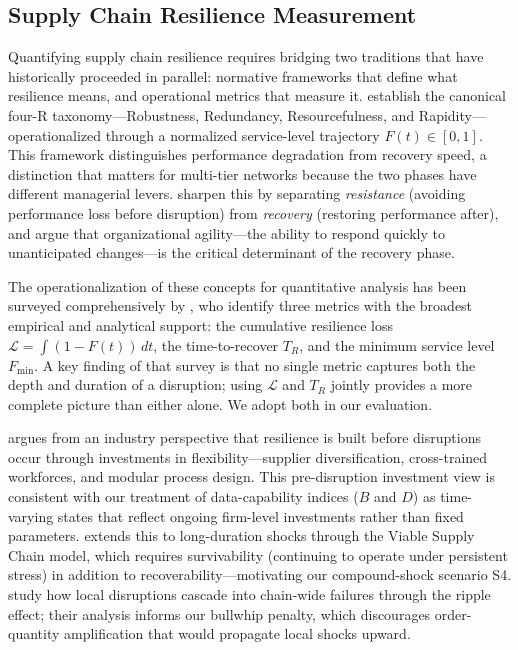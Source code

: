 \documentclass[11pt,a4paper]{article}
\theoremstyle{plain}
\theoremstyle{definition}
\begin{document}
\subsection{Supply Chain Resilience Measurement}

Quantifying supply chain resilience requires bridging two traditions that have historically
proceeded in parallel: normative frameworks that define what resilience means, and
operational metrics that measure it.  \citet{bruneau2003framework} establish the canonical
four-R taxonomy---Robustness, Redundancy, Resourcefulness, and Rapidity---operationalized
through a normalized service-level trajectory $F(t)\in[0,1]$.  This framework distinguishes
performance degradation from recovery speed, a distinction that matters for multi-tier
networks because the two phases have different managerial levers.
\citet{christopher2004building} sharpen this by separating \emph{resistance} (avoiding
performance loss before disruption) from \emph{recovery} (restoring performance after), and
argue that organizational agility---the ability to respond quickly to unanticipated
changes---is the critical determinant of the recovery phase.

The operationalization of these concepts for quantitative analysis has been surveyed
comprehensively by \citet{hosseini2019review}, who identify three metrics with the broadest
empirical and analytical support: the cumulative resilience loss $\mathcal{L}=\int(1-F(t))\,dt$,
the time-to-recover $T_R$, and the minimum service level $F_{\min}$.  A key finding of
that survey is that no single metric captures both the depth and duration of a disruption;
using $\mathcal{L}$ and $T_R$ jointly provides a more complete picture than either alone.
We adopt both in our evaluation.

\citet{sheffi2005resilient} argues from an industry perspective that resilience is built
before disruptions occur through investments in flexibility---supplier diversification,
cross-trained workforces, and modular process design.  This pre-disruption investment view
is consistent with our treatment of data-capability indices ($B$ and $D$) as time-varying
states that reflect ongoing firm-level investments rather than fixed parameters.
\citet{ivanov2020viable} extends this to long-duration shocks through the Viable Supply
Chain model, which requires survivability (continuing to operate under persistent stress)
in addition to recoverability---motivating our compound-shock scenario S4.
\citet{dolgui2021ripple} study how local disruptions cascade into chain-wide failures
through the ripple effect; their analysis informs our bullwhip penalty, which discourages
order-quantity amplification that would propagate local shocks upward.
\end{document}
